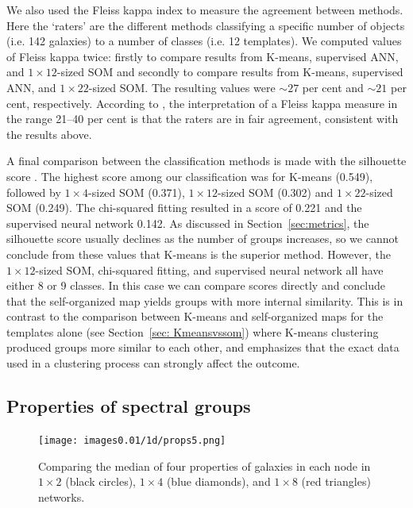         
       We also used the Fleiss kappa index \citep{Fleiss71} to 
        measure the agreement between methods. 
        Here the `raters' are the different methods classifying a specific number of objects (i.e. 142 galaxies) to a number of classes (i.e. 12 templates).
        We computed values of Fleiss kappa twice: firstly to compare results from K-means, supervised ANN, and $1\times12$-sized SOM and secondly to compare results from K-means, supervised ANN, and $1\times22$-sized SOM.
        The resulting values were $\sim 27$ per cent and $\sim 21$ per cent, respectively.
        According to \citet{landis77}, the interpretation of a Fleiss kappa measure in the range 21--40 per cent is that the raters are in fair agreement, consistent with the results above. 

A final comparison between the classification methods is 
made with the silhouette score  \citep{rousseeuw87}.
The highest score among our classification was for K-means (0.549), followed by $1\times4$-sized SOM (0.371), $1\times12$-sized SOM (0.302) and $1\times22$-sized SOM (0.249).
The chi-squared fitting resulted in a score of 0.221 and the supervised neural network 0.142.
As discussed in Section~\ref{sec:metrics}, the silhouette score usually declines as the number of groups increases, so we cannot conclude from these values that K-means is the superior method. 
However, the $1\times12$-sized SOM, chi-squared fitting, and supervised neural network all have either 8 or 9 classes.
In this case we can compare scores directly and conclude that the self-organized map yields groups with more internal similarity.
This is in contrast to the comparison between K-means and self-organized maps for the templates alone (see Section~\ref{sec: Kmeansvssom}) where K-means clustering  produced groups more similar to each other, and emphasizes that the exact data used in a clustering process can strongly affect the outcome.


 \subsection{Properties of spectral groups}
       
       \begin{figure}
            \centering
            \texttt{[image: images0.01/1d/props5.png]}
            \caption[The median of four properties of galaxies in three networks]{Comparing the median of four properties of galaxies in each node in $1\times2$ (black circles), $1\times4$ (blue diamonds), and $1\times8$ (red triangles) networks.}
            \label{fig: props}
        \end{figure} 
        
